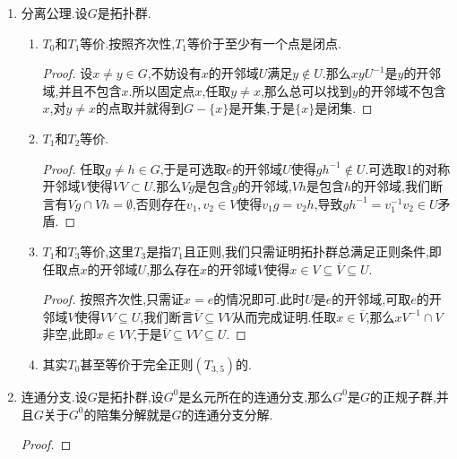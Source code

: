 \begin{enumerate}
\begin{enumerate}[(1)]
\begin{proof}
			再记$\tau:G\to G$为$g\mapsto g^{-1}$,任取$h\in\overline{H}$和$h^{-1}$的开邻域$W$,那么$\tau^{-1}(W)=W^{-1}$是包含$h$的开邻域,按照闭包定义有$g\in H\cap W^{-1}$,于是$g^{-1}\in H\cap W$,于是$g^{-1}\in\overline{H}$.
		\end{proof}
	\end{enumerate}
    \item 分离公理.设$G$是拓扑群.
    \begin{enumerate}[(1)]
    	\item $T_0$和$T_1$等价.按照齐次性,$T_1$等价于至少有一个点是闭点.
    	\begin{proof}
    		
    		设$x\not=y\in G$,不妨设有$x$的开邻域$U$满足$y\not\in U$.那么$xyU^{-1}$是$y$的开邻域,并且不包含$x$.所以固定点$x$,任取$y\not=x$,那么总可以找到$y$的开邻域不包含$x$,对$y\not=x$的点取并就得到$G-\{x\}$是开集,于是$\{x\}$是闭集.
    	\end{proof}
    	\item $T_1$和$T_2$等价.
    	\begin{proof}
    		
    		任取$g\not=h\in G$,于是可选取$e$的开邻域$U$使得$gh^{-1}\not\in U$.可选取1的对称开邻域$V$使得$VV\subset U$.那么$Vg$是包含$g$的开邻域,$Vh$是包含$h$的开邻域,我们断言有$Vg\cap Vh=\emptyset$,否则存在$v_1,v_2\in V$使得$v_1g=v_2h$,导致$gh^{-1}=v_1^{-1}v_2\in U$矛盾.
    	\end{proof}
    	\item $T_1$和$T_3$等价,这里$T_3$是指$T_1$且正则,我们只需证明拓扑群总满足正则条件,即任取点$x$的开邻域$U$,那么存在$x$的开邻域$V$使得$x\in V\subseteq\overline{V}\subseteq U$.
    	\begin{proof}
    		
    		按照齐次性,只需证$x=e$的情况即可.此时$U$是$e$的开邻域,可取$e$的开邻域$V$使得$VV\subseteq U$,我们断言$\overline{V}\subseteq VV$从而完成证明.任取$x\in\overline{V}$,那么$xV^{-1}\cap V$非空,此即$x\in VV$,于是$\overline{V}\subseteq VV\subseteq U$.
    	\end{proof}
    	\item 其实$T_0$甚至等价于完全正则$(T_{3,5})$的.
    \end{enumerate}
    \item 连通分支.设$G$是拓扑群,设$G^0$是幺元所在的连通分支,那么$G^0$是$G$的正规子群,并且$G$关于$G^0$的陪集分解就是$G$的连通分支分解.
    \begin{proof}
    	

\end{proof}
\end{enumerate}
